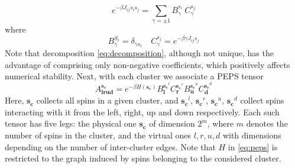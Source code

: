 \begin{equation}
  e^{-\beta J_{ij}s_i s_j} = \sum_{\gamma = \pm 1} B^{s_{i\phantom{j}}}_\gamma C^{s_j}_\gamma
\end{equation}
where
\begin{equation}
  \label{eq:decomposition}
  B^{S_i}_\gamma = \delta_{\gamma s_i} \quad C^{s_j}_\gamma = e^{-\beta \gamma J_{ij} s_j}
\end{equation}
Note that decomposition \eqref{eq:decomposition}, although not unique, has the
advantage of comprising only non-negative coefficients, which positively
affects numerical stability. Next, with each cluster we associate a PEPS tensor
\begin{equation}
  \label{eq:peps}
  A^{\mathbf{s_c}}_{\mathbf{lrud}} = e^{-\beta H(\mathbf{s_c})} B^{\mathbf{s_c}^l}_\mathbf{l}C^{\mathbf{s_c}^r}_\mathbf{r}B^{\mathbf{s_c}^u}_\mathbf{u}C^{\mathbf{s_c}^d}_\mathbf{d}
\end{equation}
Here, $\mathbf{s_c}$ collects all spins in a given cluster, and
  $\mathbf{s_c}^l$, $\mathbf{s_c}^r$, $\mathbf{s_c}^u$, $\mathbf{s_c}^d$ collect
    spins interacting with it from the left, right, up and down respectively. Each
    such tensor has five legs: the physical one $\mathbf{s_c}$ of dimension $2^m$,
    where $m$ denotes the number of spins in the cluster, and the virtual ones $l,
  r, u, d$ with dimensions depending on the number of inter-cluster edges. Note
    that $H$ in \eqref{eq:peps} is restricted to the graph induced by spins
belonging to the considered cluster. 

